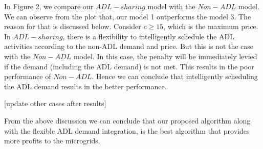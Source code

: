 In Figure 2, we compare our $ADL-sharing$ model with the $Non-ADL$ model. We can observe from the plot that, our model 1 outperforms the model 3. The reason for that is discussed below. Consider $c \geq 15$, which is the maximum price. In $ADL-sharing$, there is a flexibility to intelligently schedule the ADL activities according to the non-ADL demand and price. But this is not the case with the $Non-ADL$ model. In this case, the penalty will be immediately levied if the demand (including the ADL demand) is not met. This results in the poor performance of $Non-ADL$. Hence we can conclude that intelligently scheduling the ADL demand results in the better performance. 

[update other cases after results]

From the above discussion we can conclude that our proposed algorithm along with the flexible ADL demand integration, is the best algorithm that provides more profits to the microgrids. 